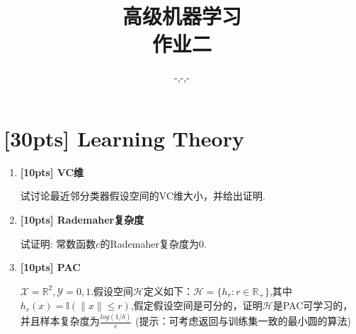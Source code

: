 \documentclass[a4paper,UTF8]{article}
\numberwithin{equation}{section}
\begin{document}
\title{高级机器学习\\
作业二}
\author{-,-,-}
\maketitle

\section{[30pts] Learning Theory}
\begin{enumerate}[(1)]
	\item \textbf{[10pts] VC维} 

	试讨论最近邻分类器假设空间的VC维大小，并给出证明.
	\item \textbf{[10pts] Rademaher复杂度}
	
	试证明: 常数函数$c$的Rademaher复杂度为$0$.
	\item \textbf{[10pts] PAC} 
	
	$\mathcal{X}=\mathbb{R}^2, \mathcal{Y}= {0,1}.$假设空间$\mathcal{H}$定义如下：$\mathcal{H}=\{h_r:r \in \mathbb{R}_+\}$,其中$h_r (x)=\mathbb{I}(\parallel x \parallel \leq r)$,假定假设空间是可分的，证明$\mathcal{H}$是PAC可学习的，并且样本复杂度为$\frac{log(1/\delta)}{\epsilon}$
	\newline
	(提示：可考虑返回与训练集一致的最小圆的算法)
\end{enumerate}
\end{document}
